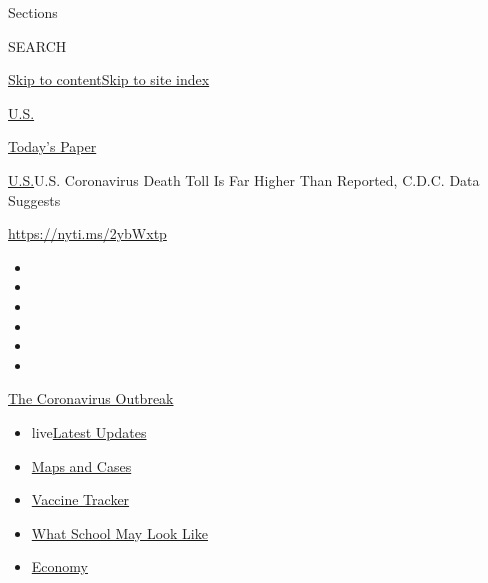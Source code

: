 Sections

SEARCH

\protect\hyperlink{site-content}{Skip to
content}\protect\hyperlink{site-index}{Skip to site index}

\href{https://www.nytimes.com/section/us}{U.S.}

\href{https://myaccount.nytimes.com/auth/login?response_type=cookie\&client_id=vi}{}

\href{https://www.nytimes.com/section/todayspaper}{Today's Paper}

\href{/section/us}{U.S.}\textbar{}U.S. Coronavirus Death Toll Is Far
Higher Than Reported, C.D.C. Data Suggests

\url{https://nyti.ms/2ybWxtp}

\begin{itemize}
\item
\item
\item
\item
\item
\item
\end{itemize}

\href{https://www.nytimes.com/news-event/coronavirus?action=click\&pgtype=Article\&state=default\&region=TOP_BANNER\&context=storylines_menu}{The
Coronavirus Outbreak}

\begin{itemize}
\tightlist
\item
  live\href{https://www.nytimes.com/2020/08/02/world/coronavirus-updates.html?action=click\&pgtype=Article\&state=default\&region=TOP_BANNER\&context=storylines_menu}{Latest
  Updates}
\item
  \href{https://www.nytimes.com/interactive/2020/us/coronavirus-us-cases.html?action=click\&pgtype=Article\&state=default\&region=TOP_BANNER\&context=storylines_menu}{Maps
  and Cases}
\item
  \href{https://www.nytimes.com/interactive/2020/science/coronavirus-vaccine-tracker.html?action=click\&pgtype=Article\&state=default\&region=TOP_BANNER\&context=storylines_menu}{Vaccine
  Tracker}
\item
  \href{https://www.nytimes.com/interactive/2020/07/29/us/schools-reopening-coronavirus.html?action=click\&pgtype=Article\&state=default\&region=TOP_BANNER\&context=storylines_menu}{What
  School May Look Like}
\item
  \href{https://www.nytimes.com/live/2020/07/31/business/stock-market-today-coronavirus?action=click\&pgtype=Article\&state=default\&region=TOP_BANNER\&context=storylines_menu}{Economy}
\end{itemize}

